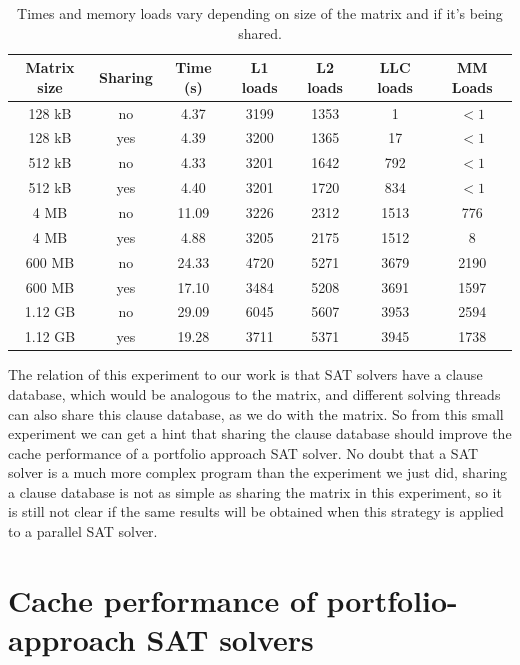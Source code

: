 \documentclass[12pt]{diicc}
\begin{document}
\begin{table}
\begin{center}
\begin{tabular}{ c | c | c | c | c | c | c }
  Matrix size & Sharing	& Time (s) & L1 loads & L2 loads & LLC loads & MM Loads \\ \hline
  128 kB 	& no	& 4.37 	& 3199  & 1353 	& 1  	& $<1$ 	 \\
  128 kB 	& yes	& 4.39 	& 3200  & 1365	& 17  	& $<1$ 	 \\
  512 kB 	& no	& 4.33 	& 3201  & 1642 	& 792	& $<1$ 	 \\ 
  512 kB 	& yes	& 4.40 	& 3201  & 1720 	& 834	& $<1$   \\ 
  4 MB 		& no	& 11.09	& 3226 	& 2312	& 1513	& 776    \\
  4 MB 		& yes	& 4.88	& 3205 	& 2175	& 1512	& 8 	 \\
  600 MB 	& no	& 24.33	& 4720	& 5271 	& 3679	& 2190   \\
  600 MB 	& yes	& 17.10	& 3484	& 5208 	& 3691	& 1597   \\
  1.12 GB 	& no	& 29.09	& 6045	& 5607 	& 3953	& 2594   \\
  1.12 GB 	& yes	& 19.28	& 3711	& 5371	& 3945	& 1738   
\end{tabular}
\caption{Times and memory loads vary depending on size of the matrix and if it's being shared.\label{tab:matrix_share}}
\end{center}
\end{table}

The relation of this experiment to our work is that SAT solvers have a clause database, which would be analogous to the matrix, and different solving threads can also share this clause database, as we do with the matrix. So from this small experiment we can get a hint that sharing the clause database should improve the cache performance of a portfolio approach SAT solver. No doubt that a SAT solver is a much more complex program than the experiment we just did, sharing a clause database is not as simple as sharing the matrix in this experiment, so it is still not clear if the same results will be obtained when this strategy is applied to a parallel SAT solver.

%  
\chapter{Cache performance of portfolio-approach SAT solvers}\label{chap:contributions}
\end{document}
